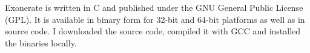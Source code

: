 Exonerate is written in C and published under the GNU General Public License
(GPL). It is available in binary form for 32-bit and 64-bit platforms as well as
in source code. I downloaded the source code, compiled it with GCC and installed
the binaries locally.
